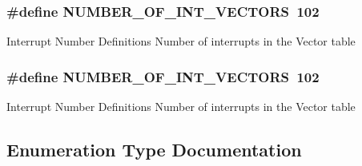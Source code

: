 \subsubsection[{\texorpdfstring{N\+U\+M\+B\+E\+R\+\_\+\+O\+F\+\_\+\+I\+N\+T\+\_\+\+V\+E\+C\+T\+O\+RS}{NUMBER_OF_INT_VECTORS}}]{\setlength{\rightskip}{0pt plus 5cm}\#define N\+U\+M\+B\+E\+R\+\_\+\+O\+F\+\_\+\+I\+N\+T\+\_\+\+V\+E\+C\+T\+O\+RS~102}\hypertarget{group__Interrupt__vector__numbers_gafe46d81f4fa2c4f6ed1361f24f046fa8}{}\label{group__Interrupt__vector__numbers_gafe46d81f4fa2c4f6ed1361f24f046fa8}
Interrupt Number Definitions Number of interrupts in the Vector table 
\subsubsection[{\texorpdfstring{N\+U\+M\+B\+E\+R\+\_\+\+O\+F\+\_\+\+I\+N\+T\+\_\+\+V\+E\+C\+T\+O\+RS}{NUMBER_OF_INT_VECTORS}}]{\setlength{\rightskip}{0pt plus 5cm}\#define N\+U\+M\+B\+E\+R\+\_\+\+O\+F\+\_\+\+I\+N\+T\+\_\+\+V\+E\+C\+T\+O\+RS~102}\hypertarget{group__Interrupt__vector__numbers_gafe46d81f4fa2c4f6ed1361f24f046fa8}{}\label{group__Interrupt__vector__numbers_gafe46d81f4fa2c4f6ed1361f24f046fa8}
Interrupt Number Definitions Number of interrupts in the Vector table 

\subsection{Enumeration Type Documentation}
